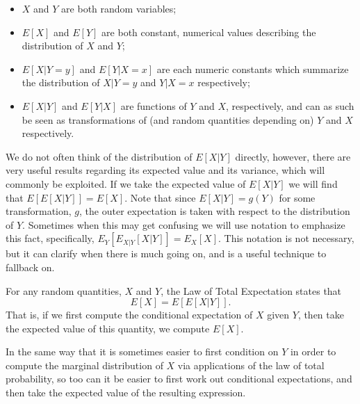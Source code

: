 \documentclass[
  letterpaper,
  DIV=11,
  numbers=noendperiod]{scrreprt}
\providecommand{\tightlist}{%
  \setlength{\itemsep}{0pt}\setlength{\parskip}{0pt}}\usepackage{longtable,booktabs,array}
\theoremstyle{definition}
\theoremstyle{definition}
\theoremstyle{definition}
\theoremstyle{remark}
\begin{document}
\begin{itemize}
\tightlist
\item
  \(X\) and \(Y\) are both random variables;
\item
  \(E[X]\) and \(E[Y]\) are both constant, numerical values describing
  the distribution of \(X\) and \(Y\);
\item
  \(E[X|Y=y]\) and \(E[Y|X=x]\) are each numeric constants which
  summarize the distribution of \(X|Y=y\) and \(Y|X=x\) respectively;
\item
  \(E[X|Y]\) and \(E[Y|X]\) are functions of \(Y\) and \(X\),
  respectively, and can as such be seen as transformations of (and
  random quantities depending on) \(Y\) and \(X\) respectively.
\end{itemize}

We do not often think of the distribution of \(E[X|Y]\) directly,
however, there are very useful results regarding its expected value and
its variance, which will commonly be exploited. If we take the expected
value of \(E[X|Y]\) we will find that \(E[E[X|Y]] = E[X]\). Note that
since \(E[X|Y] = g(Y)\) for some transformation, \(g\), the outer
expectation is taken with respect to the distribution of \(Y\).
Sometimes when this may get confusing we will use notation to emphasize
this fact, specifically, \(E_Y[E_{X|Y}[X|Y]] = E_X[X]\). This notation
is not necessary, but it can clarify when there is much going on, and is
a useful technique to fallback on.

\begin{tcolorbox}[enhanced jigsaw, coltitle=black, colframe=quarto-callout-tip-color-frame, colbacktitle=quarto-callout-tip-color!10!white, bottomrule=.15mm, opacitybacktitle=0.6, colback=white, toptitle=1mm, arc=.35mm, leftrule=.75mm, bottomtitle=1mm, opacityback=0, breakable, rightrule=.15mm, title={The Law of Total Expectation}, left=2mm, titlerule=0mm, toprule=.15mm]

For any random quantities, \(X\) and \(Y\), the Law of Total Expectation
states that \[E[X] = E[E[X|Y]].\] That is, if we first compute the
conditional expectation of \(X\) given \(Y\), then take the expected
value of this quantity, we compute \(E[X]\).

\end{tcolorbox}

In the same way that it is sometimes easier to first condition on \(Y\)
in order to compute the marginal distribution of \(X\) via applications
of the law of total probability, so too can it be easier to first work
out conditional expectations, and then take the expected value of the
resulting expression.
\end{document}
